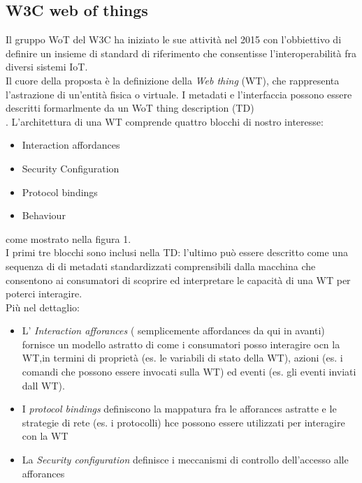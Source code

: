 \documentclass[11pt]{article}
\begin{document}
 	\subsection{W3C web of things}
 	Il gruppo WoT del W3C ha iniziato le sue attività nel 2015 con l'obbiettivo di definire un insieme di standard di riferimento che consentisse l'interoperabilità fra diversi sistemi IoT. \\
 	Il cuore della proposta è la definizione della \textit{Web thing} (WT), che rappresenta l'astrazione di un'entità fisica o virtuale.
 	I metadati e l'interfaccia possono essere descritti formarlmente da un WoT thing description (TD) \\.
 	L'architettura di una WT comprende quattro blocchi di nostro interesse:
 	\begin{itemize}
 		\item Interaction affordances
 		\item Security Configuration
 		\item Protocol bindings
 		\item Behaviour
 	\end{itemize}
 	come mostrato nella figura 1. \\
 	I primi tre blocchi sono inclusi nella TD: l'ultimo può essere descritto come una sequenza di di metadati standardizzati comprensibili dalla macchina che consentono ai consumatori di scoprire ed interpretare le capacità di una WT per poterci interagire.
 	\\ Più nel
 	dettaglio:
 	\begin{itemize}
 		\item L' \textit{Interaction afforances} ( semplicemente affordances da qui in avanti) fornisce un modello astratto di  come i consumatori posso interagire ocn la WT,in termini di proprietà (es. le variabili di stato della WT), azioni (es. i comandi che possono essere invocati sulla WT) ed eventi (es. gli eventi inviati dall WT).
 		\item I \textit{protocol bindings} definiscono la mappatura fra le afforances astratte e le strategie di rete (es. i protocolli) hce possono essere utilizzati per interagire con la WT
 		\item La \textit{Security configuration} definisce i meccanismi di controllo dell'accesso alle afforances
 	\end{itemize}
 
\end{document}
